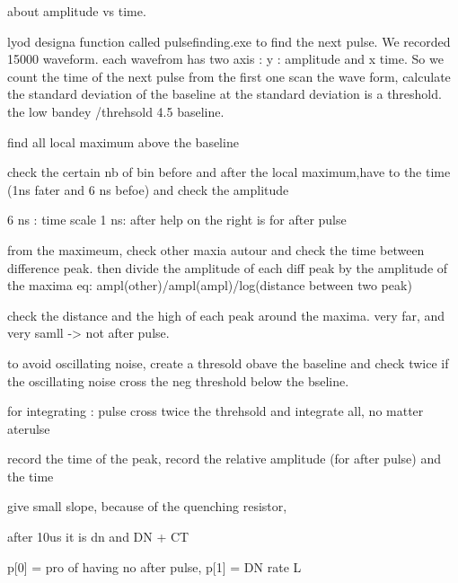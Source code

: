 about amplitude vs time.

lyod designa function called pulsefinding.exe to find the next pulse. 
We recorded 15000 waveform. each wavefrom has two axis : y : amplitude and x time. 
So we count the time of the next pulse from the first one 
scan the wave form, calculate the standard deviation of the baseline at the standard deviation is a threshold. 
the low bandey /threhsold 4.5 baseline. 

find all local maximum above the baseline

check the certain nb of bin before and after the local maximum,have to the time (1ns fater and 6 ns befoe) and check the amplitude

6 ns : time scale 
1 ns: after help on the right is for after pulse

from the maximeum, check other maxia autour and check the time between difference peak. 
then divide the amplitude of each diff peak by the amplitude of the maxima eq:
ampl(other)/ampl(ampl)/log(distance between two peak)

check the distance and the high of each peak around the maxima. 
very far, and very samll -> not after pulse. 

to avoid oscillating noise, create a thresold obave the baseline and check twice if the oscillating noise cross the neg threshold below the bseline. 

for integrating : pulse cross twice the threhsold and integrate all, no matter aterulse


record the time of the peak, 
record the relative amplitude (for after pulse) and the time

give small slope, because of the quenching resistor,

after 10us it is dn and DN + CT

p[0] = pro of having no after pulse, 
p[1] = DN rate L


